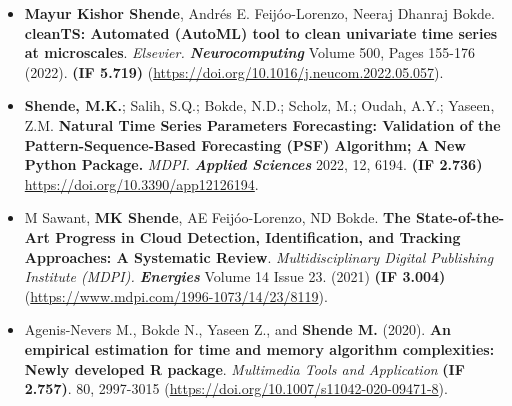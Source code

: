 \documentclass{my_cv}
\begin{document}
	\begin{itemize}
		\setlength\itemsep{1em}
		
		\item \textbf{Mayur Kishor Shende}, Andrés E. Feijóo-Lorenzo, Neeraj Dhanraj Bokde. \textbf{cleanTS: Automated (AutoML) tool to clean univariate time series at microscales}. \emph{Elsevier. \textbf{Neurocomputing}} Volume 500, Pages 155-176 (2022). \textbf{(IF 5.719)} (\url{https://doi.org/10.1016/j.neucom.2022.05.057}).\\
		\href{https://www.sciencedirect.com/science/article/pii/S0925231222006117/pdfft?isDTMRedir=true&download=true}{\faDownload}     
		
		\item \textbf{Shende, M.K.}; Salih, S.Q.; Bokde, N.D.; Scholz, M.; Oudah, A.Y.; Yaseen, Z.M. \textbf{Natural Time Series Parameters Forecasting: Validation of the Pattern-Sequence-Based Forecasting (PSF) Algorithm; A New Python Package.} \textit{MDPI}. \textbf{\textit{Applied Sciences}} 2022, 12, 6194. \textbf{(IF 2.736)} \url{https://doi.org/10.3390/app12126194}. \\
		\href{https://www.mdpi.com/2076-3417/12/12/6194/pdf}{\faDownload}    
		
		\item M Sawant, \textbf{MK Shende}, AE Feijóo-Lorenzo, ND Bokde. \textbf{The State-of-the-Art Progress in Cloud Detection, Identification, and Tracking Approaches: A Systematic Review}. \emph{Multidisciplinary Digital Publishing Institute (MDPI). \textbf{Energies}} Volume 14 Issue 23. (2021) \textbf{(IF 3.004)} (\url{https://www.mdpi.com/1996-1073/14/23/8119}).\\
		\href{https://www.mdpi.com/1996-1073/14/23/8119/pdf}{\faDownload}     
		
		\item Agenis-Nevers M., Bokde N., Yaseen Z., and \textbf{Shende M.} (2020). \textbf{An empirical estimation for time and memory algorithm complexities: Newly developed R package}. \emph{Multimedia Tools and Application} \textbf{(IF 2.757)}. 80, 2997-3015 (\url{https://doi.org/10.1007/s11042-020-09471-8}).\\
		\href{https://link.springer.com/content/pdf/10.1007/s11042-020-09471-8.pdf}{\faDownload}   
	\end{itemize}
\end{document}
